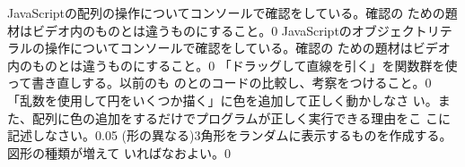 \documentclass[a4j]{jreport}
\begin{document}
{
{\Must JavaScriptの配列の操作についてコンソールで確認をしている。確認の
ための題材はビデオ内のものとは違うものにすること。}{0}
{\Must JavaScriptのオブジェクトリテラルの操作についてコンソールで確認をしている。確認の
ための題材はビデオ内のものとは違うものにすること。}{0}
}
{
{\Must 「ドラッグして直線を引く」を関数群を使って書き直しする。以前のも
のとのコードの比較し、考察をつけること。}{0}
{\Must 「乱数を使用して円をいくつか描く」に色を追加して正しく動かしなさ
い。また、配列に色の追加をするだけでプログラムが正しく実行できる理由をこ
こに記述しなさい。}{0.05}
{(形の異なる)3角形をランダムに表示するものを作成する。図形の種類が増えて
いればなおよい。}{0}
}
\end{document}
